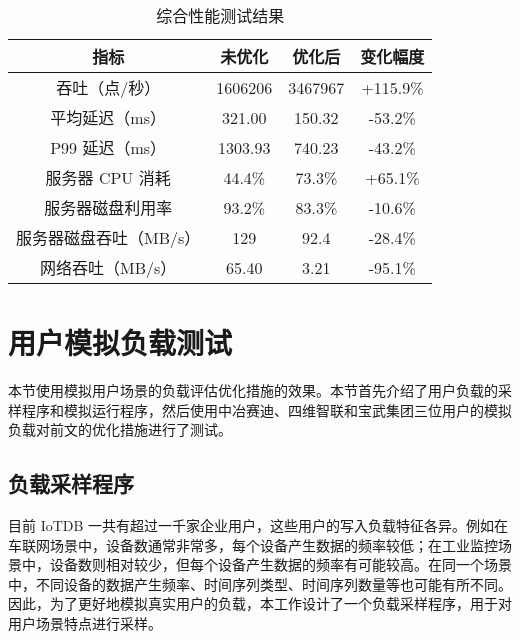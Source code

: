 \begin{table}
  \centering
  \caption{综合性能测试结果}
  \begin{tabular}{cccc}
    \toprule 
    指标 &  未优化  & 优化后 & 变化幅度 \\
    \midrule
    吞吐（点/秒） & 1606206 & 3467967 & +115.9\% \\
    平均延迟（ms） & 321.00 & 150.32 & -53.2\% \\
    P99 延迟（ms） & 1303.93 & 740.23 & -43.2\% \\
    服务器 CPU 消耗 & 44.4\% & 73.3\% & +65.1\% \\
    服务器磁盘利用率 & 93.2\% & 83.3\% & -10.6\% \\
    服务器磁盘吞吐（MB/s） & 129 & 92.4 & -28.4\% \\
    网络吞吐（MB/s） & 65.40 & 3.21 & -95.1\% \\
\bottomrule
  \end{tabular}
  \label{tabular:columnar-serialization-performance-vs-origin}
\end{table}


\section{用户模拟负载测试}
本节使用模拟用户场景的负载评估优化措施的效果。本节首先介绍了用户负载的采样程序和模拟运行程序，然后使用中冶赛迪、四维智联和宝武集团三位用户的模拟负载对前文的优化措施进行了测试。
\subsection{负载采样程序}
目前 IoTDB 一共有超过一千家企业用户，这些用户的写入负载特征各异。例如在车联网场景中，设备数通常非常多，每个设备产生数据的频率较低；在工业监控场景中，设备数则相对较少，但每个设备产生数据的频率有可能较高。在同一个场景中，不同设备的数据产生频率、时间序列类型、时间序列数量等也可能有所不同。因此，为了更好地模拟真实用户的负载，本工作设计了一个负载采样程序，用于对用户场景特点进行采样。

